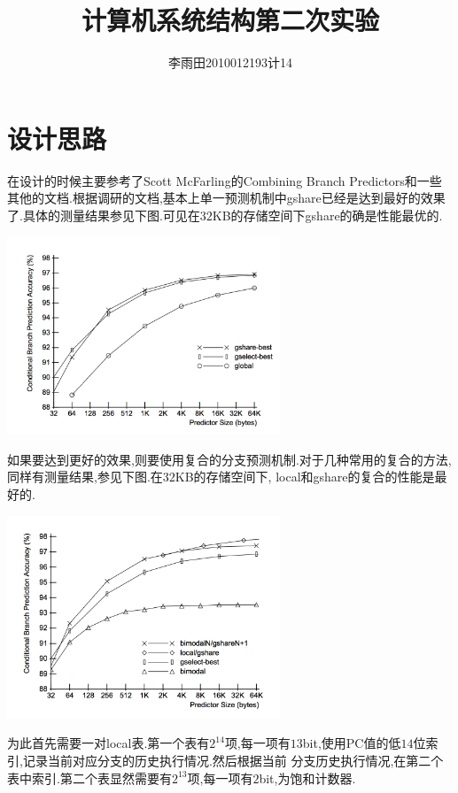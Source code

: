 \documentclass[adobefonts, nocap]{ctexart}
\begin{document}
  \title{计算机系统结构第二次实验}
  \author{李雨田\hspace{1em}2010012193\hspace{1em}计14}
  \maketitle
  \tableofcontents
  \section{设计思路}
    在设计的时候主要参考了Scott McFarling的Combining Branch Predictors和一些其他的文档.根据调研的文档,基本上单一预测机制中gshare已经是达到最好的效果了.具体的测量结果参见下图.可见在$32$KB的存储空间下gshare的确是性能最优的.

    \begin{center}
      \includegraphics[width=22em]{1.png}
    \end{center}

    如果要达到更好的效果,则要使用复合的分支预测机制.对于几种常用的复合的方法,同样有测量结果,参见下图.在$32$KB的存储空间下,
    local和gshare的复合的性能是最好的.

    \begin{center}
      \includegraphics[width=22em]{2.png}
    \end{center}

    为此首先需要一对local表.第一个表有$2^{14}$项,每一项有$13$bit,使用PC值的低$14$位索引,记录当前对应分支的历史执行情况.然后根据当前
    分支历史执行情况,在第二个表中索引.第二个表显然需要有$2^{13}$项,每一项有$2$bit,为饱和计数器.
\end{document}
